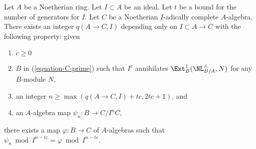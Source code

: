 \begin{lemma}
\label{lemma-get-morphism-general-better}
Let $A$ be a Noetherian ring. Let $I \subset A$ be an ideal.
Let $t$ be a bound for the number of generators for $I$.
Let $C$ be a Noetherian $I$-adically complete $A$-algebra.
There exists an integer $q(A \to C, I)$ depending only on
$I \subset A \to C$ with the following property: given
\begin{enumerate}
\item $c \geq 0$
\item $B$ in (\ref{equation-C-prime}) such that
$I^c$ annihilates $\Ext^1_B(\NL_{B/A}^\wedge, N)$
for any $B$-module $N$,
\item an integer $n \geq \max(q(A \to C, I) + tc, 2tc + 1)$, and
\item an $A$-algebra map $\psi_n : B \to C/I^nC$,
\end{enumerate}
there exists a map $\varphi : B \to C$ of $A$-algebras such
that $\psi_n \bmod I^{n - tc} = \varphi \bmod I^{n - tc}$.
\end{lemma}

